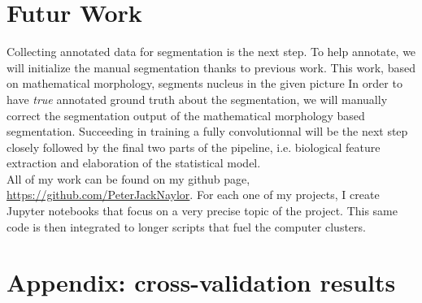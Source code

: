 \documentclass[a4paper,10pt]{article}
\begin{document}
\section{Futur Work}


Collecting annotated data for segmentation is the next step. To help
annotate, we will initialize the manual segmentation thanks to
previous work. This work, based on mathematical morphology, segments
nucleus in the given picture In order to have \textit{true} annotated
ground truth about the segmentation, we will manually correct the
segmentation output of the mathematical morphology based
segmentation. Succeeding in training a fully convolutionnal will be
the next step closely followed by the final two parts of the pipeline,
i.e. biological feature extraction and elaboration of the statistical
model.  
\\

All of my work can be found on my github page, \url{https://github.com/PeterJackNaylor}. For each one of my projects, I create Jupyter notebooks that focus on a very precise topic of the project. This same code is then integrated to longer scripts that fuel the computer clusters.
\newpage
\section*{Appendix: cross-validation results}
\end{document}
